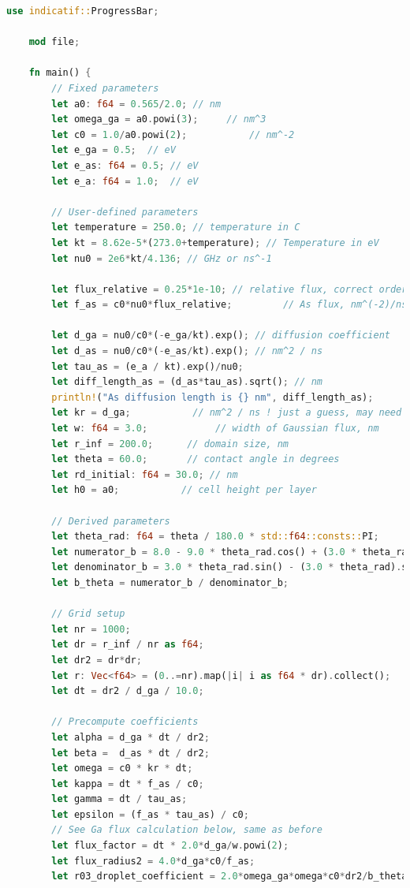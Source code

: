 \documentclass[14pt,oneside]{extarticle}
\begin{document}
\begin{lstlisting}[language=Rust]
    use indicatif::ProgressBar;

    mod file;
    
    fn main() {
        // Fixed parameters
        let a0: f64 = 0.565/2.0; // nm
        let omega_ga = a0.powi(3);     // nm^3
        let c0 = 1.0/a0.powi(2);           // nm^-2
        let e_ga = 0.5;  // eV
        let e_as: f64 = 0.5; // eV
        let e_a: f64 = 1.0;  // eV
    
        // User-defined parameters
        let temperature = 250.0; // temperature in C
        let kt = 8.62e-5*(273.0+temperature); // Temperature in eV
        let nu0 = 2e6*kt/4.136; // GHz or ns^-1
    
        let flux_relative = 0.25*1e-10; // relative flux, correct order, do not change the order
        let f_as = c0*nu0*flux_relative;         // As flux, nm^(-2)/ns
    
        let d_ga = nu0/c0*(-e_ga/kt).exp(); // diffusion coefficient
        let d_as = nu0/c0*(-e_as/kt).exp(); // nm^2 / ns
        let tau_as = (e_a / kt).exp()/nu0;
        let diff_length_as = (d_as*tau_as).sqrt(); // nm
        println!("As diffusion length is {} nm", diff_length_as);
        let kr = d_ga;           // nm^2 / ns ! just a guess, may need to change
        let w: f64 = 3.0;            // width of Gaussian flux, nm
        let r_inf = 200.0;      // domain size, nm
        let theta = 60.0;       // contact angle in degrees
        let rd_initial: f64 = 30.0; // nm
        let h0 = a0;           // cell height per layer
    
        // Derived parameters
        let theta_rad: f64 = theta / 180.0 * std::f64::consts::PI;
        let numerator_b = 8.0 - 9.0 * theta_rad.cos() + (3.0 * theta_rad).cos();
        let denominator_b = 3.0 * theta_rad.sin() - (3.0 * theta_rad).sin();
        let b_theta = numerator_b / denominator_b;
    
        // Grid setup
        let nr = 1000;
        let dr = r_inf / nr as f64;
        let dr2 = dr*dr;
        let r: Vec<f64> = (0..=nr).map(|i| i as f64 * dr).collect();
        let dt = dr2 / d_ga / 10.0;
    
        // Precompute coefficients
        let alpha = d_ga * dt / dr2;
        let beta =  d_as * dt / dr2;
        let omega = c0 * kr * dt;
        let kappa = dt * f_as / c0;
        let gamma = dt / tau_as;
        let epsilon = (f_as * tau_as) / c0;
        // See Ga flux calculation below, same as before
        let flux_factor = dt * 2.0*d_ga/w.powi(2);
        let flux_radius2 = 4.0*d_ga*c0/f_as;
        let r03_droplet_coefficient = 2.0*omega_ga*omega*c0*dr2/b_theta;
    

\end{lstlisting}
\end{document}
